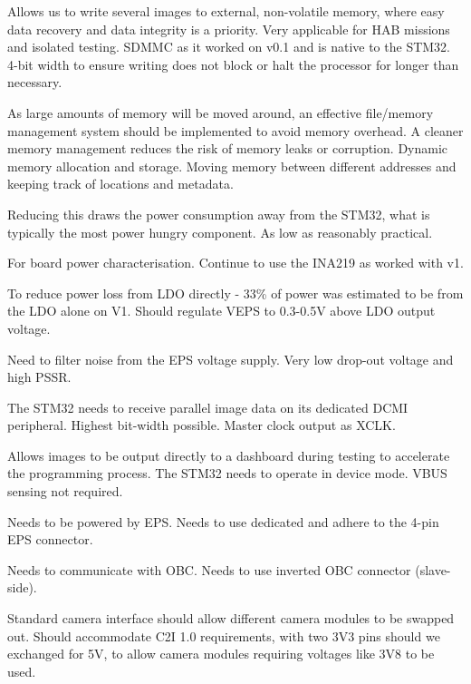 {Allows us to write several images to external, non-volatile memory, where easy data recovery and data integrity is a priority. Very applicable for HAB missions and isolated testing.}
{SDMMC as it worked on v0.1 and is native to the STM32. 4-bit width to ensure writing does not block or halt the processor for longer than necessary.}

{As large amounts of memory will be moved around, an effective file/memory management system should be implemented to avoid memory overhead. A cleaner memory management reduces the risk of memory leaks or corruption.}
{Dynamic memory allocation and storage. Moving memory between different addresses and keeping track of locations and metadata.}


{Reducing this draws the power consumption away from the STM32, what is typically the most power hungry component.}
{As low as reasonably practical.}

{For board power characterisation.}
{Continue to use the INA219 as worked with v1.}

{To reduce power loss from LDO directly - 33\% of power was estimated to be from the LDO alone on V1.}
{Should regulate VEPS to 0.3-0.5V above LDO output voltage.}

{Need to filter noise from the EPS voltage supply.}
{Very low drop-out voltage and high PSSR.}


{The STM32 needs to receive parallel image data on its dedicated DCMI peripheral.}
{Highest bit-width possible. Master clock output as XCLK.}

{Allows images to be output directly to a dashboard during testing to accelerate the programming process.}
{The STM32 needs to operate in device mode. VBUS sensing not required.}

{Needs to be powered by EPS.}
{Needs to use dedicated and adhere to the 4-pin EPS connector.}

{Needs to communicate with OBC.}
{Needs to use inverted OBC connector (slave-side).}

{Standard camera interface should allow different camera modules to be swapped out.}
{Should accommodate C2I 1.0 requirements, with two 3V3 pins should we exchanged for 5V, to allow camera modules requiring voltages like 3V8 to be used.}

